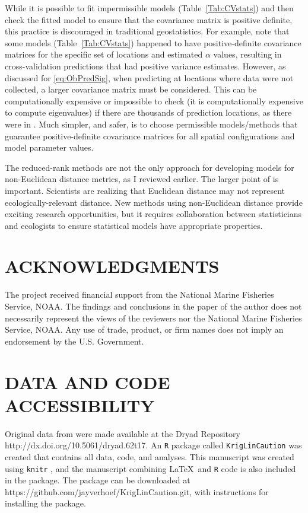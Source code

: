 \documentclass[11pt, titlepage]{article}\usepackage[]{graphicx}\usepackage[]{color}
\begin{document}
\begin{spacing}{1.9}
\begin{flushleft}
While it is possible to fit impermissible models (Table~\ref{Tab:CVstats}) and then check the fitted model to ensure that the covariance matrix is positive definite, this practice is discouraged in traditional geostatistics. For example, note that some models (Table~\ref{Tab:CVstats}) happened to have positive-definite covariance matrices for the specific set of locations and estimated $\alpha$ values, resulting in cross-validation predictions that had positive variance estimates.  However, as discussed for \ref{eq:ObPredSig}, when predicting at locations where data were not collected, a larger covariance matrix must be considered. This can be computationally expensive or impossible to check (it is computationally expensive to compute eigenvalues) if there are thousands of prediction locations, as there were in \citet{Ladl:Avga:Whea:Boyc:pred:2016}. Much simpler, and safer, is to choose permissible models/methods that guarantee positive-definite covariance matrices for all spatial configurations and model parameter values. 

The reduced-rank methods are not the only approach for developing models for non-Euclidean distance metrics, as I reviewed earlier. The larger point of \citet{Ladl:Avga:Whea:Boyc:pred:2016} is important. Scientists are realizing that Euclidean distance may not represent ecologically-relevant distance.  New methods using non-Euclidean distance provide exciting research opportunities, but it requires collaboration between statisticians and ecologists to ensure statistical models have appropriate properties. 

\section*{ACKNOWLEDGMENTS} 

The project received financial support from the National Marine Fisheries Service, NOAA. The findings and conclusions in the paper of the author does not necessarily represent the views of the reviewers nor the National Marine Fisheries Service, NOAA. Any use of trade, product, or firm names does not imply an endorsement by the U.S. Government. 

\section*{DATA AND CODE ACCESSIBILITY}

Original data from \citet{Ladl:Avga:Whea:Boyc:pred:2016} were made available at the Dryad Repository http://dx.doi.org/10.5061/dryad.62t17. An \texttt{R} \citep{R:Deve:Core:ALan:2017} package called \texttt{KrigLinCaution} was created that contains all data, code, and analyses. This manuscript was created using \texttt{knitr} \citep{Yihu:impl:2014,Yihu:dyna:2015,Yihu:knit:2016}, and the manuscript combining \LaTeX\ and \texttt{R} code is also included in the package.  The package can be downloaded at https://github.com/jayverhoef/KrigLinCaution.git, with instructions for installing the package.


\end{flushleft}
\end{spacing}
\end{document}
